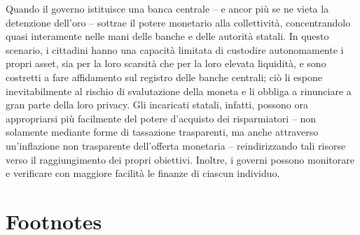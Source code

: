 \documentclass[
  a5paper,
  smalldemyvopaper,10pt,twoside,onecolumn,openright,extrafontsizes,hidelinks]{memoir}
\begin{document}
Quando il governo istituisce una banca centrale -- e ancor più se ne
vieta la detenzione dell'oro -- sottrae il potere monetario alla
collettività, concentrandolo quasi interamente nelle mani delle banche e
delle autorità statali. In questo scenario, i cittadini hanno una
capacità limitata di custodire autonomamente i propri asset, sia per la
loro scarsità che per la loro elevata liquidità, e sono costretti a fare
affidamento sul registro delle banche centrali; ciò li espone
inevitabilmente al rischio di svalutazione della moneta e li obbliga a
rinunciare a gran parte della loro privacy. Gli incaricati statali,
infatti, possono ora appropriarsi più facilmente del potere d'acquisto
dei risparmiatori -- non solamente mediante forme di tassazione
trasparenti, ma anche attraverso un'inflazione non trasparente
dell'offerta monetaria -- reindirizzando tali risorse verso il
raggiungimento dei propri obiettivi. Inoltre, i governi possono
monitorare e verificare con maggiore facilità le finanze di ciascun
individuo.

\section{Footnotes}\label{footnotes-7}


\backmatter
\end{document}
